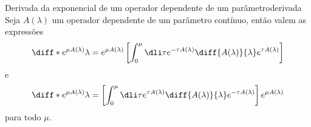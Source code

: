 \begin{lemma}{Derivada da exponencial de um operador dependente de um parâmetro}{derivada}
    Seja \(A(\lambda)\) um operador dependente de um parâmetro contínuo, então valem as expressões
    \begin{equation*}
       \diff*{e^{\mu A(\lambda)}}{\lambda} = e^{\mu A(\lambda)}\left[\int_0^\mu \dli\tau e^{-\tau A(\lambda)} \diff{A(\lambda)}{\lambda} e^{\tau A(\lambda)}\right]
    \end{equation*}
    e
    \begin{equation*}
       \diff*{e^{\mu A(\lambda)}}{\lambda} = \left[\int_0^\mu \dli\tau e^{\tau A(\lambda)} \diff{A(\lambda)}{\lambda} e^{-\tau A(\lambda)}\right] e^{\mu A(\lambda)}
    \end{equation*}
    para todo \(\mu.\)
\end{lemma}
